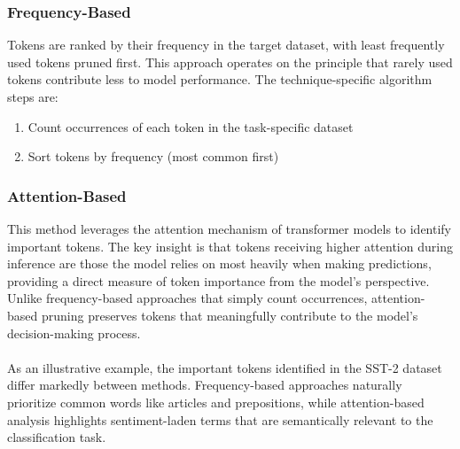 \documentclass[twocolumn]{article}
\begin{document}
\subsubsection{Frequency-Based}
Tokens are ranked by their frequency in the target dataset, with least frequently used tokens pruned first. This approach operates on the principle that rarely used tokens contribute less to model performance. The technique-specific algorithm steps are:

\begin{enumerate}
    \item Count occurrences of each token in the task-specific dataset
    \item Sort tokens by frequency (most common first)
\end{enumerate}
\subsubsection{Attention-Based}
This method leverages the attention mechanism of transformer models to identify important tokens. The key insight is that tokens receiving higher attention during inference are those the model relies on most heavily when making predictions, providing a direct measure of token importance from the model's perspective. Unlike frequency-based approaches that simply count occurrences, attention-based pruning preserves tokens that meaningfully contribute to the model's decision-making process.
\\ \\
As an illustrative example, the important tokens identified in the SST-2 dataset differ markedly between methods. Frequency-based approaches naturally prioritize common words like articles and prepositions, while attention-based analysis highlights sentiment-laden terms that are semantically relevant to the classification task.
\end{document}
